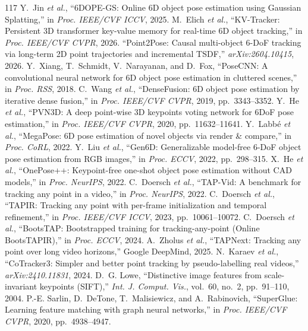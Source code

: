 \documentclass[10pt,journal]{IEEEtran}
\begin{document}
{\begin{thebibliography}{117}
 Y.~Jin \emph{et al.}, ``6DOPE-GS: Online 6D object pose estimation using Gaussian Splatting,'' in \emph{Proc. IEEE/CVF ICCV}, 2025.
 M.~Elich \emph{et al.}, ``KV-Tracker: Persistent 3D transformer key-value memory for real-time 6D object tracking,'' in \emph{Proc. IEEE/CVF CVPR}, 2026.
 ``Point2Pose: Causal multi-object 6-DoF tracking via long-term 2D point trajectories and incremental TSDF,'' \emph{arXiv:2604.10415}, 2026.
 Y.~Xiang, T.~Schmidt, V.~Narayanan, and D.~Fox, ``PoseCNN: A convolutional neural network for 6D object pose estimation in cluttered scenes,'' in \emph{Proc. RSS}, 2018.
 C.~Wang \emph{et al.}, ``DenseFusion: 6D object pose estimation by iterative dense fusion,'' in \emph{Proc. IEEE/CVF CVPR}, 2019, pp.~3343--3352.
 Y.~He \emph{et al.}, ``PVN3D: A deep point-wise 3D keypoints voting network for 6DoF pose estimation,'' in \emph{Proc. IEEE/CVF CVPR}, 2020, pp.~11632--11641.
 Y.~Labb\'e \emph{et al.}, ``MegaPose: 6D pose estimation of novel objects via render \& compare,'' in \emph{Proc. CoRL}, 2022.
 Y.~Liu \emph{et al.}, ``Gen6D: Generalizable model-free 6-DoF object pose estimation from RGB images,'' in \emph{Proc. ECCV}, 2022, pp.~298--315.
 X.~He \emph{et al.}, ``OnePose++: Keypoint-free one-shot object pose estimation without CAD models,'' in \emph{Proc. NeurIPS}, 2022.
 C.~Doersch \emph{et al.}, ``TAP-Vid: A benchmark for tracking any point in a video,'' in \emph{Proc. NeurIPS}, 2022.
 C.~Doersch \emph{et al.}, ``TAPIR: Tracking any point with per-frame initialization and temporal refinement,'' in \emph{Proc. IEEE/CVF ICCV}, 2023, pp.~10061--10072.
 C.~Doersch \emph{et al.}, ``BootsTAP: Bootstrapped training for tracking-any-point (Online BootsTAPIR),'' in \emph{Proc. ECCV}, 2024.
 A.~Zholus \emph{et al.}, ``TAPNext: Tracking any point over long video horizons,'' Google DeepMind, 2025.
 N.~Karaev \emph{et al.}, ``CoTracker3: Simpler and better point tracking by pseudo-labelling real videos,'' \emph{arXiv:2410.11831}, 2024.
 D.~G. Lowe, ``Distinctive image features from scale-invariant keypoints (SIFT),'' \emph{Int. J. Comput. Vis.}, vol.~60, no.~2, pp.~91--110, 2004.
 P.-E. Sarlin, D.~DeTone, T.~Malisiewicz, and A.~Rabinovich, ``SuperGlue: Learning feature matching with graph neural networks,'' in \emph{Proc. IEEE/CVF CVPR}, 2020, pp.~4938--4947.

\end{thebibliography}}
\end{document}
